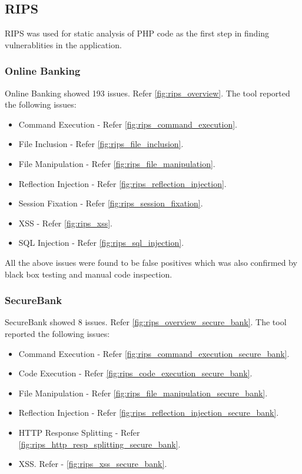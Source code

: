 \subsection{RIPS}
RIPS was used for static analysis of PHP code as the first step in finding vulnerablities in the application.
\subsubsection{Online Banking }
Online Banking showed 193 issues. Refer \ref{fig:rips_overview}. The tool reported the following issues:
\begin{itemize}
    \item Command Execution - Refer \ref{fig:rips_command_execution}.
    \item File Inclusion - Refer \ref{fig:rips_file_inclusion}.
    \item File Manipulation - Refer \ref{fig:rips_file_manipulation}.
    \item Reflection Injection - Refer \ref{fig:rips_reflection_injection}.
    \item Session Fixation - Refer \ref{fig:rips_session_fixation}.
    \item XSS - Refer \ref{fig:rips_xss}.
    \item SQL Injection - Refer \ref{fig:rips_sql_injection}.
\end{itemize}
All the above issues were found to be false positives which was also confirmed by black box testing and manual code inspection.

\subsubsection{SecureBank}
SecureBank showed 8 issues. Refer \ref{fig:rips_overview_secure_bank}. The tool reported the following issues:
\begin{itemize}
    \item Command Execution - Refer \ref{fig:rips_command_execution_secure_bank}.
    \item Code Execution - Refer \ref{fig:rips_code_execution_secure_bank}.
    \item File Manipulation - Refer \ref{fig:rips_file_manipulation_secure_bank}.
    \item Reflection Injection - Refer \ref{fig:rips_reflection_injection_secure_bank}.
    \item HTTP Response Splitting - Refer \ref{fig:rips_http_resp_splitting_secure_bank}.
    \item XSS. Refer - \ref{fig:rips_xss_secure_bank}.
\end{itemize}

